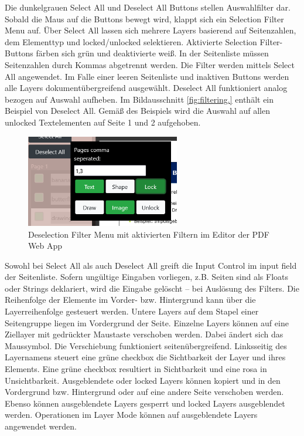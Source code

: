 Die dunkelgrauen Select All und Deselect All Buttons stellen Auswahlfilter dar. Sobald die Maus auf die Buttons bewegt wird, klappt sich ein Selection Filter Menu auf. Über Select All lassen sich mehrere Layers basierend auf Seitenzahlen, dem Elementtyp und locked/unlocked selektieren. Aktivierte Selection Filter-Buttons färben sich grün und deaktivierte weiß. In der Seitenliste müssen Seitenzahlen durch Kommas abgetrennt werden. Die Filter werden mittels Select All angewendet. Im Falle einer leeren Seitenliste und inaktiven Buttons werden alle Layers dokumentübergreifend ausgewählt. Deselect All funktioniert analog bezogen auf Auswahl aufheben. Im Bildausschnitt \ref{fig:filtering.} enthält ein Beispiel von Deselect All. Gemäß des Beispiels wird die Auswahl auf allen unlocked Textelementen auf Seite 1 und 2 aufgehoben. 

\begin{figure}[!htbp]
	\centering
	\includegraphics[width=0.6\textwidth]{"images/filtering.png"}
	\caption{Deselection Filter Menu mit aktivierten Filtern im Editor der PDF Web App}
	\label{fig:filtering}
\end{figure}

Sowohl bei Select All als auch Deselect All greift die Input Control im input field der Seitenliste. Sofern ungültige Eingaben vorliegen, z.B. Seiten sind als Floats oder Strings deklariert, wird die Eingabe gelöscht – bei Auslösung des Filters. Die Reihenfolge der Elemente im Vorder- bzw. Hintergrund kann über die Layerreihenfolge gesteuert werden. Untere Layers auf dem Stapel einer Seitengruppe liegen im Vordergrund der Seite. Einzelne Layers können auf eine Ziellayer mit gedrückter Maustaste verschoben werden. Dabei ändert sich das Maussymbol. Die Verschiebung funktioniert seitenübergreifend. Linksseitig des Layernamens steuert eine grüne checkbox die Sichtbarkeit der Layer und ihres Elements. Eine grüne checkbox resultiert in Sichtbarkeit und eine rosa in Unsichtbarkeit. Ausgeblendete oder locked Layers können kopiert und in den Vordergrund bzw. Hintergrund oder auf eine andere Seite verschoben werden. Ebenso können ausgeblendete Layers gesperrt und locked Layers ausgeblendet werden. Operationen im Layer Mode können auf ausgeblendete Layers angewendet werden.


